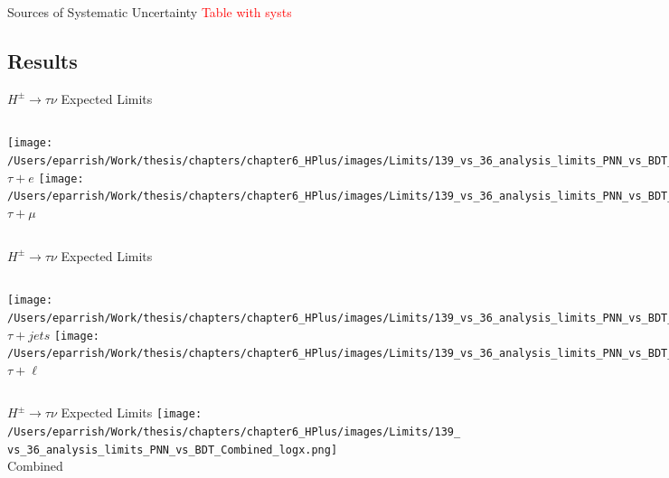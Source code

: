 \documentclass[aspectratio=169,xcolor=table]{beamer}
\begin{document}
    \begin{frame}[t]{Sources of Systematic Uncertainty}
      \textcolor{red}{Table with systs}
    \end{frame}

  \subsection{Results }

    \begin{frame}{$H^{\pm} \rightarrow \tau\nu$ Expected Limits}
      \centering
      \small
      \begin{columns}
        \centering
        \texttt{[image: /Users/eparrish/Work/thesis/chapters/chapter6\_HPlus/images/Limits/139\_vs\_36\_analysis\_limits\_PNN\_vs\_BDT\_TauEl\_logx.png]} \\
        \centering
        $\tau+e$
        \texttt{[image: /Users/eparrish/Work/thesis/chapters/chapter6\_HPlus/images/Limits/139\_vs\_36\_analysis\_limits\_PNN\_vs\_BDT\_TauMu\_logx.png]}\\
        \centering
        $\tau+\mu$
      \end{columns}
    \end{frame}

    \begin{frame}{$H^{\pm} \rightarrow \tau\nu$ Expected Limits}
      \centering
      \small
      \begin{columns}
        \texttt{[image: /Users/eparrish/Work/thesis/chapters/chapter6\_HPlus/images/Limits/139\_vs\_36\_analysis\_limits\_PNN\_vs\_BDT\_TauJets\_logx.png]} \\
        \centering
        $\tau+jets$
        \texttt{[image: /Users/eparrish/Work/thesis/chapters/chapter6\_HPlus/images/Limits/139\_vs\_36\_analysis\_limits\_PNN\_vs\_BDT\_TauLep\_logx.png]} \\
        \centering
        $\tau+\ell$
      \end{columns}
      \end{frame}

      \begin{frame}{$H^{\pm} \rightarrow \tau\nu$ Expected Limits}
      \centering
      \texttt{[image: /Users/eparrish/Work/thesis/chapters/chapter6\_HPlus/images/Limits/139\_vs\_36\_analysis\_limits\_PNN\_vs\_BDT\_Combined\_logx.png]} \\
      \centering
      Combined
    \end{frame}
\end{document}
